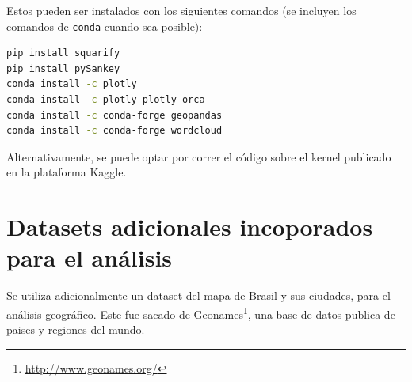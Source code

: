 \documentclass[a4paper]{article}
\begin{document}
Estos pueden ser instalados con los siguientes comandos (se incluyen los comandos de \texttt{conda} cuando sea posible): 
\begin{lstlisting}[language=sh]
pip install squarify
pip install pySankey
conda install -c plotly
conda install -c plotly plotly-orca
conda install -c conda-forge geopandas
conda install -c conda-forge wordcloud
\end{lstlisting}

Alternativamente, se puede optar por correr el código sobre el kernel publicado en la plataforma Kaggle.

\section{Datasets adicionales incoporados para el análisis}

Se utiliza adicionalmente un dataset del mapa de Brasil y sus ciudades, para el análisis geográfico. Este fue sacado de  Geonames\footnote{\url{http://www.geonames.org/}}, una base de datos publica de paises y regiones del mundo.
\end{document}
